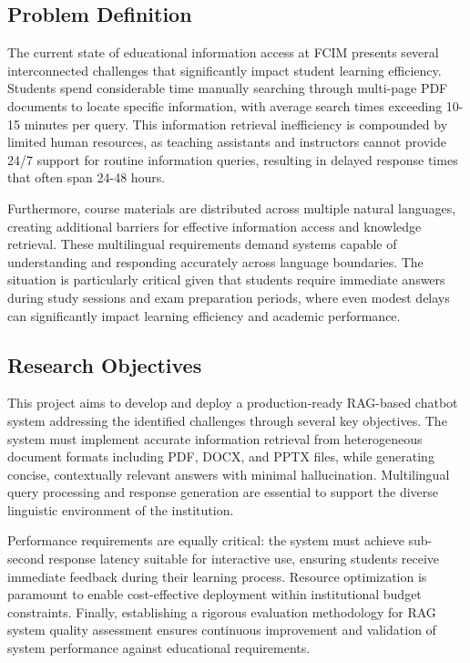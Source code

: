 \documentclass[12pt,a4paper]{article}
\begin{document}
\subsection{Problem Definition}
The current state of educational information access at FCIM presents several interconnected challenges that significantly impact student learning efficiency. Students spend considerable time manually searching through multi-page PDF documents to locate specific information, with average search times exceeding 10-15 minutes per query. This information retrieval inefficiency is compounded by limited human resources, as teaching assistants and instructors cannot provide 24/7 support for routine information queries, resulting in delayed response times that often span 24-48 hours.

Furthermore, course materials are distributed across multiple natural languages, creating additional barriers for effective information access and knowledge retrieval. These multilingual requirements demand systems capable of understanding and responding accurately across language boundaries. The situation is particularly critical given that students require immediate answers during study sessions and exam preparation periods, where even modest delays can significantly impact learning efficiency and academic performance.

\subsection{Research Objectives}
This project aims to develop and deploy a production-ready RAG-based chatbot system addressing the identified challenges through several key objectives. The system must implement accurate information retrieval from heterogeneous document formats including PDF, DOCX, and PPTX files, while generating concise, contextually relevant answers with minimal hallucination. Multilingual query processing and response generation are essential to support the diverse linguistic environment of the institution.

Performance requirements are equally critical: the system must achieve sub-second response latency suitable for interactive use, ensuring students receive immediate feedback during their learning process. Resource optimization is paramount to enable cost-effective deployment within institutional budget constraints. Finally, establishing a rigorous evaluation methodology for RAG system quality assessment ensures continuous improvement and validation of system performance against educational requirements.
\end{document}
